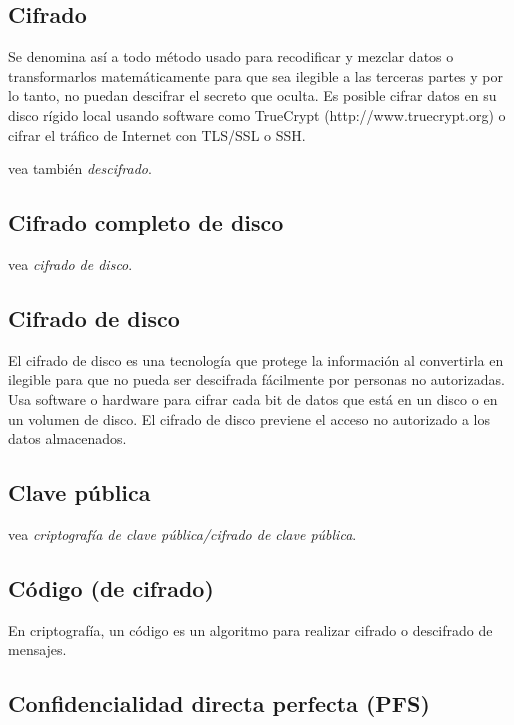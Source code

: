 \subsection{Cifrado}\label{cifrado}

Se denomina así a todo método usado para recodificar y mezclar datos o
transformarlos matemáticamente para que sea ilegible a las terceras
partes y por lo tanto, no puedan descifrar el secreto que oculta. Es
posible cifrar datos en su disco rígido local usando software como
TrueCrypt (http://www.truecrypt.org) o cifrar el tráfico de Internet con
TLS/SSL o SSH.

vea también \emph{descifrado}.

\subsection{Cifrado completo de disco}\label{cifrado-completo-de-disco}

vea \emph{cifrado de disco}.

\subsection{Cifrado de disco}\label{cifrado-de-disco}

El cifrado de disco es una tecnología que protege la información al
convertirla en ilegible para que no pueda ser descifrada fácilmente por
personas no autorizadas. Usa software o hardware para cifrar cada bit de
datos que está en un disco o en un volumen de disco. El cifrado de disco
previene el acceso no autorizado a los datos almacenados.

\subsection{Clave pública}\label{clave-puxfablica}

vea \emph{criptografía de clave pública/cifrado de clave pública}.

\subsection{Código (de cifrado)}\label{cuxf3digo-de-cifrado}

En criptografía, un código es un algoritmo para realizar cifrado o
descifrado de mensajes.

\subsection{Confidencialidad directa perfecta
(PFS)}\label{confidencialidad-directa-perfecta-pfs}

